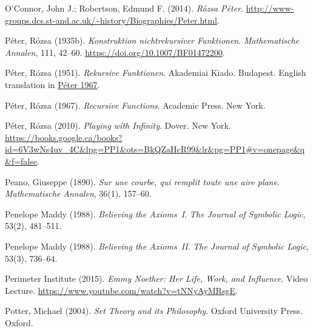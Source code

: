 \par\medskip{}\label{bib:Oconnor2014}
O'Connor, John J.; Robertson, Edmund F. (2014). \emph{R\'{o}zsa {P}\'{e}ter}. \url{http://www-groups.dcs.st-and.ac.uk/~history/Biographies/Peter.html}.

\par\medskip{}\label{bib:Peter1935b}
P\'eter, R\'ozsa (1935b). \emph{Konstruktion nichtrekursiver {F}unktionen}. \emph{Mathematische Annalen}, 111, 42--60. \url{https://doi.org/10.1007/BF01472200}.

\par\medskip{}\label{bib:Peter1951}
P\'eter, R\'ozsa (1951). \emph{Rekursive Funktionen}. Akademiai Kiado. Budapest. English translation in \hyperref[bib:Peter1967]{P\'eter 1967}.

\par\medskip{}\label{bib:Peter1967}
P\'eter, R\'ozsa (1967). \emph{Recursive Functions}. Academic Press. New York.

\par\medskip{}\label{bib:Peter2010}
P\'eter, R\'ozsa (2010). \emph{Playing with Infinity}. Dover. New York. \url{https://books.google.ca/books?id=6V3wNs4uv_4C&lpg=PP1&ots=BkQZaHcR99&lr&pg=PP1#v=onepage&q&f=false}.

\par\medskip{}\label{bib:Peano1890}
Peano, Giuseppe (1890). \emph{Sur une courbe, qui remplit toute une aire plane}. \emph{Mathematische Annalen}, 36(1), 157--60.

\par\medskip{}\label{bib:Maddy1988a}
Penelope Maddy (1988). \emph{Believing the Axioms~{I}}. \emph{The Journal of Symbolic Logic}, 53(2), 481--511.

\par\medskip{}\label{bib:Maddy1988b}
Penelope Maddy (1988). \emph{Believing the Axioms~{II}}. \emph{The Journal of Symbolic Logic}, 53(3), 736--64.

\par\medskip{}\label{bib:Perimeter2015}
Perimeter Institute (2015). \emph{Emmy {N}oether: Her Life, Work, and Influence}. Video Lecture. \url{https://www.youtube.com/watch?v=tNNyAyMRsgE}.

\par\medskip{}\label{bib:Potter2004}
Potter, Michael (2004). \emph{Set Theory and its Philosophy}. Oxford University Press. Oxford.

